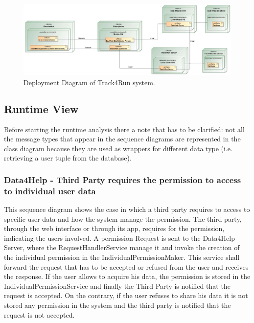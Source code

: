 \documentclass[a4paper]{article}
\begin{document}
\begin{figure}[H]
    \centering
    \includegraphics[width=\linewidth]{deploymentDiagram-Track4Run}
    \caption{Deployment Diagram of Track4Run system.}
    \label{fig:my_label}
\end{figure}
\clearpage

\subsection{Runtime View}
Before starting the runtime analysis there a note that has to be clarified: not all the message types that appear in the sequence diagrams are represented in the class diagram because they are used as wrappers for different data type (i.e. retrieving a user tuple from the database).

\subsubsection{Data4Help - Third Party requires the permission to access to individual user data}
This sequence diagram shows the case in which a third party requires to access to specific user data and how the system manage the permission.
The third party, through the web interface or through its app, requires for the permission, indicating the users involved. A permission Request is sent to the Data4Help Server, where the RequestHandlerService manage it and invoke the creation of the individual permission in the IndividualPermissionMaker. This service shall forward the request that has to be accepted or refused from the user and receives the response. If the user allows to acquire his data, the permission is stored in the IndividualPermissionService and finally the Third Party is notified that the request is accepted.
On the contrary, if the user refuses to share his data it is not stored any permission in the system and the third party is notified that the request is not accepted.
\end{document}
